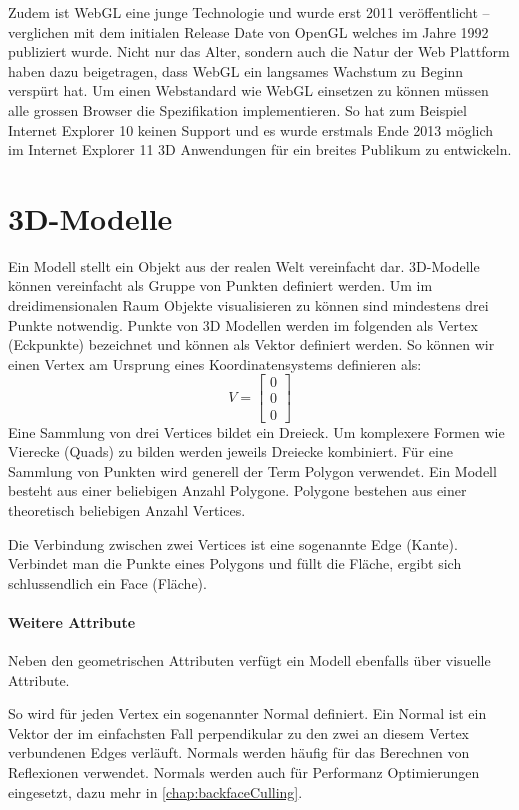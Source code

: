 Zudem ist WebGL eine junge Technologie und wurde erst 2011 veröffentlicht – verglichen mit dem initialen Release Date von OpenGL welches im Jahre 1992 publiziert wurde.
Nicht nur das Alter, sondern auch die Natur der Web Plattform haben dazu beigetragen, dass WebGL ein langsames Wachstum zu Beginn verspürt hat. Um einen Webstandard wie WebGL einsetzen zu können müssen alle grossen Browser die Spezifikation implementieren. So hat zum Beispiel Internet Explorer 10 keinen Support und es wurde erstmals Ende 2013 möglich im Internet Explorer 11 3D Anwendungen für ein breites Publikum zu entwickeln.

\section{3D-Modelle}
Ein Modell stellt ein Objekt aus der realen Welt vereinfacht dar.
3D-Modelle können vereinfacht als Gruppe von Punkten definiert werden.
Um im dreidimensionalen Raum Objekte visualisieren zu können sind mindestens drei Punkte notwendig.
Punkte von 3D Modellen werden im folgenden als Vertex (Eckpunkte) bezeichnet und können als Vektor definiert werden.
So können wir einen Vertex am Ursprung eines Koordinatensystems definieren als:
$$ V =
\begin{bmatrix}
  0 \\
  0 \\
  0
\end{bmatrix}
$$
Eine Sammlung von drei Vertices bildet ein Dreieck. Um komplexere Formen wie Vierecke (Quads) zu bilden werden jeweils Dreiecke kombiniert.
Für eine Sammlung von Punkten wird generell der Term Polygon verwendet.
Ein Modell besteht aus einer beliebigen Anzahl Polygone.
Polygone bestehen aus einer theoretisch beliebigen Anzahl Vertices.

Die Verbindung zwischen zwei Vertices ist eine sogenannte Edge (Kante).
Verbindet man die Punkte eines Polygons und füllt die Fläche, ergibt sich schlussendlich ein Face (Fläche).

\paragraph{Weitere Attribute}
Neben den geometrischen Attributen verfügt ein Modell ebenfalls über visuelle Attribute.

So wird für jeden Vertex ein sogenannter Normal definiert. Ein Normal ist ein Vektor der im einfachsten Fall perpendikular zu den zwei an diesem Vertex verbundenen Edges verläuft. Normals werden häufig für das Berechnen von Reflexionen verwendet.
Normals werden auch für Performanz Optimierungen eingesetzt, dazu mehr in \autoref{chap:backfaceCulling}.

